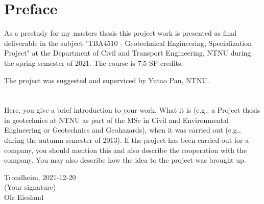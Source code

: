 \section*{Preface}
As a prestudy for my masters thesis this project work is presented as final deliverable in the subject "TBA4510 - Geotechnical Engineering, Specialization Project" at the Department of Civil and Transport Engineering, NTNU during the spring semester of 2021. 
The course is 7.5 SP credits.

The project was suggested and superviced by Yutao Pan, NTNU.
\\
\\
\\
Here, you give a brief introduction to your work. What it is (e.g., a Project thesis in geotechnics at NTNU as part of the MSc in Civil and Environmental Engineering or Geotechnics and Geohazards), when it was carried out (e.g., during the autumn semester of 2013). If the project has been carried out for a company, you should mention this and also describe the cooperation with the company. You may also describe how the idea to the project was brought up.\\[2cm]

\begin{center}
Trondheim, 2021-12-20\\[1pc]
(Your signature)\\[1pc]
Ole Eiesland
\end{center}
